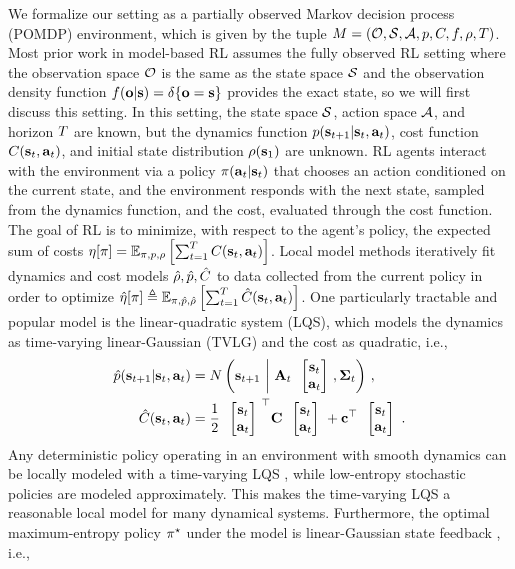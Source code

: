 We formalize our setting as a partially observed Markov decision process (POMDP) environment, which is given by the tuple $M=(\mathcal{O},\mathcal{S},\mathcal{A},p,C,f,\rho,T)$. Most prior work in model-based RL assumes the fully observed RL setting where the observation space $\mathcal{O}$ is the same as the state space $\mathcal{S}$ and the observation density function $f(\mathbf{o}|\mathbf{s})=\delta\{\mathbf{o}=\mathbf{s}\}$ provides the exact state, so we will first discuss this setting. In this setting, the state space $\mathcal{S}$, action space $\mathcal{A}$, and horizon $T$ are known, but the dynamics function $p(\mathbf{s}_{t+1}|\mathbf{s}_t,\mathbf{a}_t)$, cost function $C(\mathbf{s}_t,\mathbf{a}_t)$, and initial state distribution $\rho(\mathbf{s}_1)$ are unknown. RL agents interact with the environment via a policy $\pi(\mathbf{a}_t|\mathbf{s}_t)$ that chooses an action conditioned on the current state, and the environment responds with the next state, sampled from the dynamics function, and the cost, evaluated through the cost function. The goal of RL is to minimize, with respect to the agent's policy, the expected sum of costs $\eta[\pi]=\mathbb{E}_{\pi,p,\rho}\left[\sum_{t=1}^TC(\mathbf{s}_t,\mathbf{a}_t)\right]$. Local model methods iteratively fit dynamics and cost models $\hat{\rho},\hat{p},\hat{C}$ to data collected from the current policy in order to optimize $\hat{\eta}[\pi]\triangleq\mathbb{E}_{\pi,\hat{p},\hat{\rho}}\left[\sum_{t=1}^T\hat{C}(\mathbf{s}_t,\mathbf{a}_t)\right]$. One particularly tractable and popular model is the linear-quadratic system (LQS), which models the dynamics as time-varying linear-Gaussian (TVLG) and the cost as quadratic, i.e.,
\begin{align*}
    \dynmodel(\state_{t+1}|\state_t,\action_t)&=\N\left(\state_{t+1}~\bigg|~\dynmat_t\colvec{\state_t\\\action_t},\dyncovar_t\right)\,,\\
    \costmodel(\state_t,\action_t)&=\frac{1}{2}\colvec{\state_t\\\action_t}^\top\costmat\colvec{\state_t\\\action_t}+\costvec^\top\colvec{\state_t\\\action_t}\,.
\end{align*}
Any deterministic policy operating in an environment with smooth dynamics can be locally modeled with a time-varying LQS \citep{convex}, while low-entropy stochastic policies are modeled approximately. This makes the time-varying LQS a reasonable local model for many dynamical systems. Furthermore, the optimal maximum-entropy policy $\pi^\star$ under the model is linear-Gaussian state feedback \citep{ddp}, i.e.,
